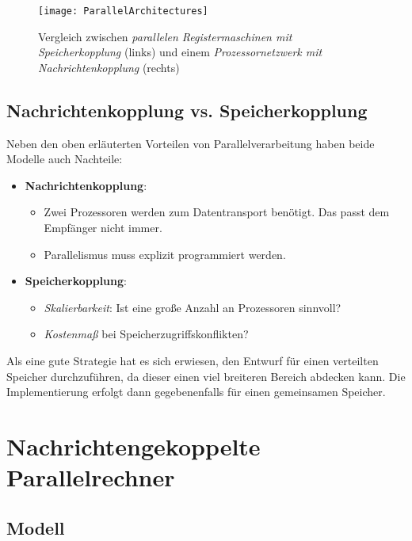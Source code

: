 \begin{figure}[H]
  \texttt{[image: ParallelArchitectures]}
  \caption{Vergleich zwischen \emph{parallelen Registermaschinen mit Speicherkopplung} (links) und einem \emph{Prozessornetzwerk mit Nachrichtenkopplung} (rechts)}
\end{figure}

\subsection{Nachrichtenkopplung vs. Speicherkopplung}

Neben den oben erläuterten Vorteilen von Parallelverarbeitung haben beide Modelle auch Nachteile:

\begin{itemize}
  \item \textbf{Nachrichtenkopplung}:
  \begin{itemize}
    \item Zwei Prozessoren werden zum Datentransport benötigt. Das passt dem Empfänger nicht immer.
    \item Parallelismus muss explizit programmiert werden.
  \end{itemize}
  \item \textbf{Speicherkopplung}:
  \begin{itemize}
    \item \emph{Skalierbarkeit}: Ist eine große Anzahl an Prozessoren sinnvoll?
    \item \emph{Kostenmaß} bei Speicherzugriffskonflikten?
  \end{itemize}
\end{itemize}

Als eine gute Strategie hat es sich erwiesen, den Entwurf für einen verteilten Speicher durchzuführen, da dieser einen viel breiteren Bereich abdecken kann. Die Implementierung erfolgt dann gegebenenfalls für einen gemeinsamen Speicher.

\section{Nachrichtengekoppelte Parallelrechner}

\subsection{Modell}

